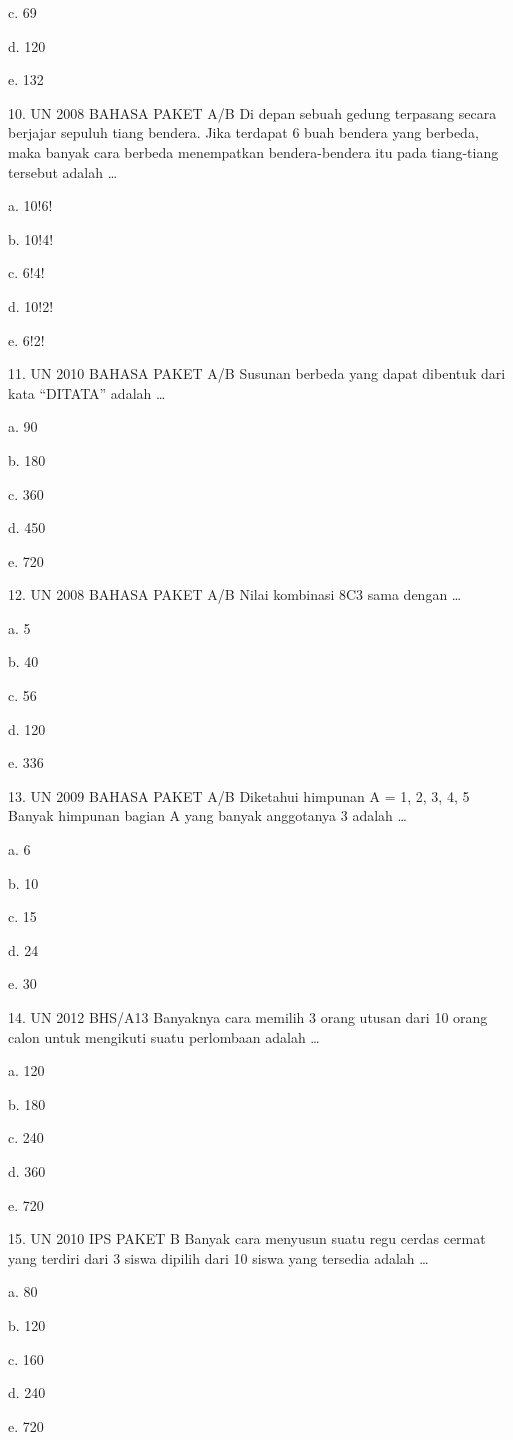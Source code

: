 \documentclass[11pt,fleqn]{book} %
\begin{document}
c.	69

d.	120

e.	132

10.	UN 2008 BAHASA PAKET A/B 
Di depan sebuah gedung terpasang secara berjajar sepuluh tiang bendera. Jika terdapat 6 buah bendera yang berbeda, maka banyak cara berbeda menempatkan bendera-bendera itu pada tiang-tiang tersebut adalah …

a.	10!6!

b.	10!4!

c.	6!4!

d.	10!2!

e.	6!2!

11.	UN 2010 BAHASA PAKET A/B 
Susunan berbeda yang dapat dibentuk dari kata “DITATA” adalah …

a.	90

b.	180

c.	360

d.	450

e.	720

12.	UN 2008 BAHASA PAKET A/B 
Nilai kombinasi 8C3 sama dengan …

a.	5

b.	40

c.	56

d.	120

e.	336

13.	UN 2009 BAHASA PAKET A/B 
Diketahui himpunan A = {1, 2, 3, 4, 5} Banyak himpunan bagian A yang banyak anggotanya 3 adalah …

a.	6

b.	10

c.	15

d.	24

e.	30

14.	UN 2012 BHS/A13 
Banyaknya cara memilih 3 orang utusan dari 10 orang calon untuk mengikuti suatu perlombaan adalah …

a.	120

b.	180

c.	240

d.	360

e.	720

15.	UN 2010 IPS PAKET B 
Banyak cara menyusun suatu regu cerdas cermat yang terdiri dari 3 siswa dipilih dari 10 siswa yang tersedia adalah …

a.	80

b.	120

c.	160

d.	240

e.	720
\end{document}

